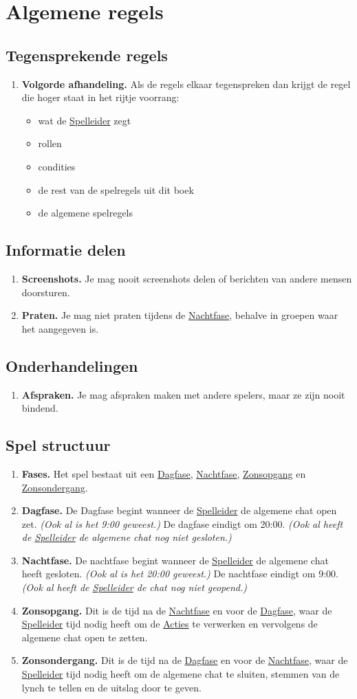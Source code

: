 \documentclass{article}
\newenvironment{rulesubsection}[1]{
    \subsection{#1} \label{rule:#1}
    \begin{enumerate}[label=\thesubsection.\arabic{enumi}]
}{
    \end{enumerate}
}
\newcommand{\ruleitem}[1]{\item \label{rule:#1} \textbf{#1.}}
\newcommand{\ruleref}[1]{\hyperref[rule:#1]{#1}}
\begin{document}
\section{Algemene regels}
\begin{rulesubsection}{Tegensprekende regels}
    \ruleitem{Volgorde afhandeling} Als de regels elkaar tegenspreken dan krijgt de regel die hoger staat in het rijtje voorrang:
    \begin{itemize}
        \item wat de \ruleref{Spelleider} zegt
        \item rollen
        \item condities
        \item de rest van de spelregels uit dit boek
        \item de algemene spelregels
    \end{itemize} 
\end{rulesubsection}
\begin{rulesubsection}{Informatie delen}
    \ruleitem{Screenshots} Je mag nooit screenshots delen of berichten van andere mensen doorsturen.
    \ruleitem{Praten} Je mag niet praten tijdens de \ruleref{Nachtfase}, behalve in groepen waar het aangegeven is.
\end{rulesubsection}
\begin{rulesubsection}{Onderhandelingen}
    \ruleitem{Afspraken} Je mag afspraken maken met andere spelers, maar ze zijn nooit bindend.
\end{rulesubsection}
\begin{rulesubsection}{Spel structuur}
    \ruleitem{Fases} Het spel bestaat uit een \ruleref{Dagfase}, \ruleref{Nachtfase}, \ruleref{Zonsopgang} en \ruleref{Zonsondergang}.
    \ruleitem{Dagfase} De Dagfase begint wanneer de \ruleref{Spelleider} de algemene chat open zet. \textit{(Ook al is het 9:00 geweest.)}
    De dagfase eindigt om 20:00. \textit{(Ook al heeft de \ruleref{Spelleider} de algemene chat nog niet gesloten.)}
    \ruleitem{Nachtfase} De nachtfase begint wanneer de \ruleref{Spelleider} de algemene chat heeft gesloten. \textit{(Ook al is het 20:00 geweest.)}
    De nachtfase eindigt om 9:00. \textit{(Ook al heeft de \ruleref{Spelleider} de chat nog niet geopend.)}
    \ruleitem{Zonsopgang} Dit is de tijd na de \ruleref{Nachtfase} en voor de \ruleref{Dagfase}, waar de \ruleref{Spelleider} tijd nodig heeft om de \ruleref{Acties} te verwerken
    en vervolgens de algemene chat open te zetten.
    \ruleitem{Zonsondergang} Dit is de tijd na de \ruleref{Dagfase} en voor de \ruleref{Nachtfase}, waar de \ruleref{Spelleider} tijd nodig heeft om de algemene chat te sluiten,
    stemmen van de lynch te tellen en de uitslag door te geven.
\end{rulesubsection}
\end{document}

